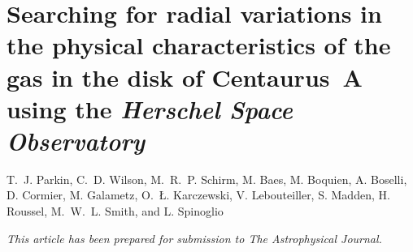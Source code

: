 \pagestyle{fancy}
\headheight 20pt
\chead{}
\lfoot{}
\cfoot{\thepage}
\rfoot{}
\renewcommand{\headrulewidth}{0.1pt}
\renewcommand{\footrulewidth}{0.1pt}

\chapter{Searching for radial variations in the physical characteristics of the gas in the disk of Centaurus~A using the \emph{Herschel Space Observatory}} \label{chapter4}

\thispagestyle{fancy}

\noindent T.~J. Parkin, C.~D. Wilson, M.~R.~P. Schirm, M. Baes, M. Boquien, A. Boselli, D. Cormier, M. Galametz, O.~\L. Karczewski, V. Lebouteiller, S. Madden, H. Roussel, M.~W.~L. Smith, and L. Spinoglio

\vspace{1.5cm}

\noindent \emph{This article has been prepared for submission to The Astrophysical Journal.}


